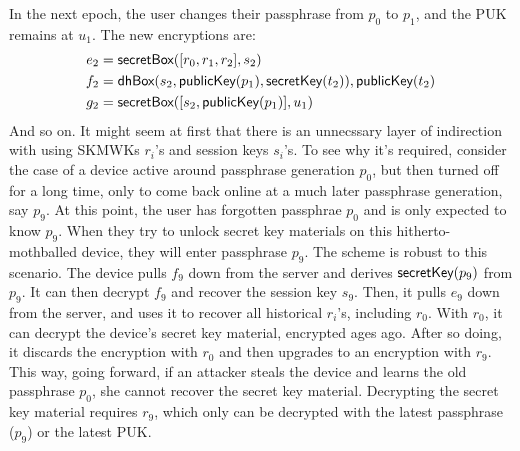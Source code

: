 In the next epoch, the user changes their passphrase from $p_0$ to $p_1$, and the PUK remains
at $u_1$. The new encryptions are:
%
\begin{align*}
e_2 &= \textsf{secretBox}([r_0,r_1,r_2], s_2) \\
f_2 &= \textsf{dhBox}(s_2, \textsf{publicKey}(p_1), \textsf{secretKey}(t_2)), \textsf{publicKey}(t_2) \\
g_2 &= \textsf{secretBox}([s_2,\textsf{publicKey}(p_1)], u_1) \\
\end{align*}
%
And so on. It might seem at first that there is an unnecssary layer of indirection with using
SKMWKs $r_i$'s and session keys $s_i$'s. To see why it's required, consider the case of a 
device active around passphrase generation $p_0$, but then turned off for a long time,
only to come back online at a much later passphrase generation, say $p_9$. At this point,
the user has forgotten passphrae $p_0$ and is only expected to know $p_9$. When they try
to unlock secret key materials on this hitherto-mothballed device, they will enter passphrase
$p_9$. The scheme is robust to this scenario. The device pulls $f_9$ down from the server
and derives $\textsf{secretKey}(p_9)$ from $p_9$. It can then decrypt $f_9$ and recover the session key $s_9$.
Then, it pulls $e_9$ down from the server, and uses it to recover all historical $r_i$'s, including
$r_0$. With $r_0$, it can decrypt the device's secret key material, encrypted ages ago. After so doing, it discards
the encryption with $r_0$ and then upgrades to an encryption with $r_9$. This way, going forward,
if an attacker steals the device and learns the old passphrase $p_0$, she cannot recover
the secret key material. Decrypting the secret key material requires $r_9$, which only
can be decrypted with the latest passphrase ($p_9$) or the latest PUK.



